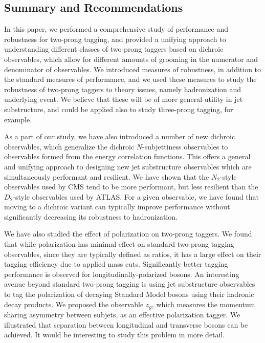 \subsection{Summary and Recommendations}\label{sec:SM_jetsub_2prong:conc}

In this paper, we performed a comprehensive study of performance and robustness for two-prong tagging, and provided a unifying approach to understanding different classes of two-prong taggers based on dichroic observables, which allow for different amounts of grooming in the numerator and denominator of observables.
%
We introduced measures of robustness, in addition to the standard measures of performance, and we used these measures to study the robustness of two-prong taggers to theory issues, namely hadronization and underlying event.
%
We believe that these will be of more general utility in jet substructure, and could be applied also to study three-prong tagging, for example.

As a part of our study, we have also introduced a number of new dichroic observables, which generalize the dichroic $N$-subjettiness observables to observables formed from the energy correlation functions.
%
This offers a general and unifying approach to designing new jet substructure observables which are simultaneously performant and resilient.
%
We have shown that the $N_2$-style observables used by CMS tend to be more performant, but less resilient than the $D_2$-style observables used by ATLAS.
%
For a given observable, we have found that moving to a dichroic variant can typically improve performance without significantly decreasing its robustness to hadronization.

We have also studied the effect of polarization on two-prong taggers.
%
We found that while polarization has minimal effect on standard two-prong tagging observables, since they are typically defined as ratios, it has a large effect on their tagging efficiency due to applied mass cuts.
%
Significantly better tagging performance is observed for longitudinally-polarized bosons.
%
An interesting avenue beyond standard two-prong tagging is using jet substructure observables to tag the polarization of decaying Standard Model bosons using their hadronic decay products.
%
We proposed the observable $z_g$, which measures the momentum sharing asymmetry between subjets, as an effective polarization tagger.
%
We illustrated that separation between longitudinal and transverse bosons can be achieved.
%
It would be interesting to study this problem in more detail.

